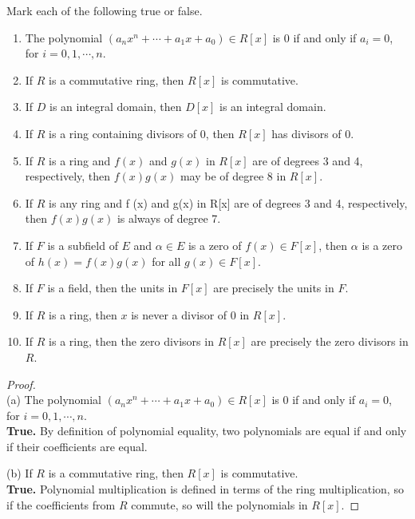 \documentclass[12pt]{amsart}
\theoremstyle{definition}
\numberwithin{equation}{section}
\theoremstyle{plain}
\begin{document}
\begin{exercise}{23}  Mark each of the following true or false. \\
    \begin{enumerate}[label=(\alph*.)]
        \item The polynomial $(a_n x^n + \cdots + a_1x + a_0) \in R[x]$ is $0$ if and only if $a_i = 0$, for $i = 0, 1, \cdots , n$.
        \item If $R$ is a commutative ring, then $R[x]$ is commutative.
        \item If $D$ is an integral domain, then $D[x]$ is an integral domain.
        \item If $R$ is a ring containing divisors of $0$, then $R[x]$ has divisors of $0$.
        \item If $R$ is a ring and $f(x)$ and $g(x)$ in $R[x]$ are of degrees 3 and 4, respectively, then $f(x)g(x)$ may be of degree 8 in $R[x]$.
        \item If $R$ is any ring and f (x) and g(x) in R[x] are of degrees 3 and 4, respectively, then $f(x)g(x)$ is always of degree 7.
        \item If $F$ is a subfield of $E$ and $\alpha \in E$ is a zero of $f(x) \in F[x]$, then $\alpha$ is a zero of $h(x) = f(x)g(x)$ for all $g(x) \in F[x]$.
        \item If $F$ is a field, then the units in $F[x]$ are precisely the units in $F$.
        \item If $R$ is a ring, then $x$ is never a divisor of $0$ in $R[x]$.
        \item If $R$ is a ring, then the zero divisors in $R[x]$ are precisely the zero divisors in $R$.
    \end{enumerate}

    \begin{proof} $ $ \\
    (a) The polynomial \( (a_n x^n + \cdots + a_1x + a_0) \in R[x] \) is \( 0 \) if and only if \( a_i = 0 \), for \( i = 0, 1, \cdots , n \).\\  
    \textbf{True.} By definition of polynomial equality, two polynomials are equal if and only if their coefficients are equal.
    
    (b) If \( R \) is a commutative ring, then \( R[x] \) is commutative.\\  
    \textbf{True.} Polynomial multiplication is defined in terms of the ring multiplication, so if the coefficients from \( R \) commute, so will the polynomials in \( R[x] \).
    

\end{proof}
\end{exercise}
\end{document}

